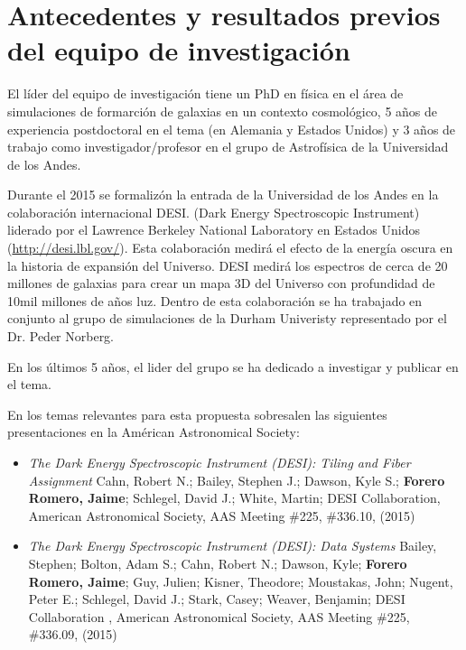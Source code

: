 \section{Antecedentes y resultados previos del equipo de
  investigaci\'on} 

El l\'ider del equipo de investigaci\'on tiene un PhD en f\'isica en el \'area de simulaciones de formarci\'on de galaxias en un  contexto
cosmol\'ogico, 5 a\~nos de experiencia postdoctoral en el tema (en
Alemania y Estados Unidos) y 3 a\~nos de trabajo como
investigador/profesor en el grupo de  Astrof\'isica de la Universidad
de los Andes. 


Durante el 2015 se formaliz\'on la entrada de la Universidad de los Andes en la colaboraci\'on internacional DESI. (Dark Energy Spectroscopic Instrument) liderado por el Lawrence
Berkeley National Laboratory en Estados Unidos
(\url{http://desi.lbl.gov/}). 
Esta colaboraci\'on medir\'a el efecto
de la energ\'ia oscura en la historia de expansi\'on del
Universo. 
DESI medir\'a los espectros de cerca de 20 millones de galaxias
para crear un mapa 3D del Universo con  profundidad de 10mil
millones de a\~nos luz. 
Dentro de esta colaboraci\'on se ha trabajado en conjunto al grupo de
simulaciones de la Durham Univeristy representado por el Dr. Peder
Norberg.  



En los \'ultimos 5 a\~nos, el lider del grupo se ha dedicado a
investigar y publicar en el tema. 

En los temas relevantes para esta propuesta sobresalen las siguientes 
presentaciones en la Am\'erican Astronomical Society:


\begin{itemize}
\item {\it The Dark Energy Spectroscopic Instrument (DESI): Tiling and
  Fiber Assignment} Cahn, Robert N.; Bailey, Stephen J.; Dawson, Kyle
  S.; {\bf Forero Romero, Jaime}; Schlegel, David J.; White, Martin;
  DESI Collaboration, American Astronomical Society, AAS Meeting \#225,
  \#336.10, (2015)
\item {\it The Dark Energy Spectroscopic Instrument (DESI): Data
  Systems} 	
	Bailey, Stephen; Bolton, Adam S.; Cahn, Robert N.; Dawson,
        Kyle; {\bf Forero Romero, Jaime}; Guy, Julien; Kisner, Theodore;
        Moustakas, John; Nugent, Peter E.; Schlegel, David J.; Stark,
        Casey; Weaver, Benjamin; DESI Collaboration , American
        Astronomical Society, AAS Meeting \#225, \#336.09, (2015)
\end{itemize}


